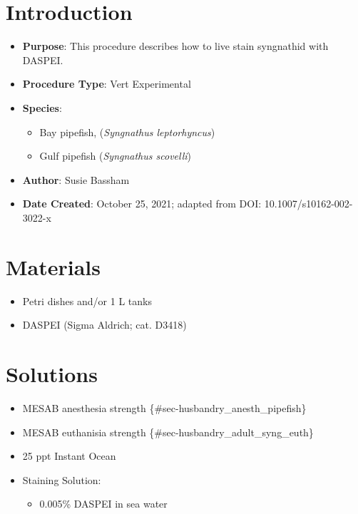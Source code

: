 \documentclass[
  letterpaper,
  DIV=11,
  numbers=noendperiod]{scrreprt}
\providecommand{\tightlist}{%
  \setlength{\itemsep}{0pt}\setlength{\parskip}{0pt}}\usepackage{longtable,booktabs,array}
\begin{document}
\hypertarget{introduction-88}{%
\section{Introduction}\label{introduction-88}}

\begin{itemize}
\tightlist
\item
  \textbf{Purpose}: This procedure describes how to live stain
  syngnathid with DASPEI.
\item
  \textbf{Procedure Type}: Vert Experimental
\item
  \textbf{Species}:

  \begin{itemize}
  \tightlist
  \item
    Bay pipefish, (\emph{Syngnathus leptorhyncus})
  \item
    Gulf pipefish (\emph{Syngnathus scovelli})
  \end{itemize}
\item
  \textbf{Author}: Susie Bassham
\item
  \textbf{Date Created}: October 25, 2021; adapted from DOI:
  10.1007/s10162-002-3022-x
\end{itemize}

\hypertarget{materials-83}{%
\section{Materials}\label{materials-83}}

\begin{itemize}
\tightlist
\item
  Petri dishes and/or 1 L tanks
\item
  DASPEI (Sigma Aldrich; cat. D3418)
\end{itemize}

\hypertarget{solutions-75}{%
\section{Solutions}\label{solutions-75}}

\begin{itemize}
\tightlist
\item
  MESAB anesthesia strength \{\#sec-husbandry\_anesth\_pipefish\}
\item
  MESAB euthanisia strength \{\#sec-husbandry\_adult\_syng\_euth\}
\item
  25 ppt Instant Ocean
\item
  Staining Solution:

  \begin{itemize}
  \tightlist
  \item
    0.005\% DASPEI in sea water
  \end{itemize}
\end{itemize}
\end{document}
